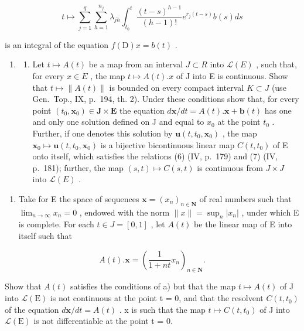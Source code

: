\[
t \mapsto \sum_ {j = 1} ^ {q} \sum_ {h = 1} ^ {n _ {j}} \lambda_ {j h} \int_ {t _ {0}} ^ {t} \frac {(t - s) ^ {h - 1}}{(h - 1) !} e ^ {r _ {j} (t - s)} b (s) d s
\]

is an integral of the equation \(f(\mathrm{D})x = b(t)\) .

\begin{enumerate}
\def\labelenumi{\arabic{enumi})}
\setcounter{enumi}{6}
\tightlist
\item
  \begin{enumerate}
  \def\labelenumii{\alph{enumii})}
  \tightlist
  \item
    Let \(t \mapsto A(t)\) be a map from an interval \(J \subset R\) into \(\mathcal{L}(E)\) , such that, for every \(x \in E\) , the map \(t \mapsto A(t).x\) of J into E is continuous. Show that \(t \mapsto \|A(t)\|\) is bounded on every compact interval \(K \subset J\) (use Gen.~Top., IX, p.~194, th. 2). Under these conditions show that, for every point \((t_{0}, \mathbf{x}_{0}) \in \mathbf{J} \times \mathbf{E}\) the equation \(d\mathbf{x}/dt = A(t).\mathbf{x} + \mathbf{b}(t)\) has one and only one solution defined on J and equal to \(x_{0}\) at the point \(t_{0}\) . Further, if one denotes this solution by \(\mathbf{u}(t, t_{0}, \mathbf{x}_{0})\) , the map \(\mathbf{x}_{0} \mapsto \mathbf{u}(t, t_{0}, \mathbf{x}_{0})\) is a bijective bicontinuous linear map \(C(t, t_{0})\) of E onto itself, which satisfies the relations (6) (IV, p.~179) and (7) (IV, p.~181); further, the map \((s, t) \mapsto C(s, t)\) is continuous from \(J \times J\) into \(\mathcal{L}(E)\) .
  \end{enumerate}
\end{enumerate}

\begin{enumerate}
\def\labelenumi{\alph{enumi})}
\setcounter{enumi}{1}
\tightlist
\item
  Take for E the space of sequences \(\mathbf{x}=(x_{n})_{n\in\mathbf{N}}\) of real numbers such that \(\lim_{n\to\infty}x_{n}=0\) , endowed with the norm \(\|x\|=\sup_{n}|x_{n}|\) , under which E is complete. For each \(t\in J=[0,1]\) , let \(A(t)\) be the linear map of E into itself such that
\end{enumerate}

\[
A (t). \mathbf {x} = \left(\frac {1}{1 + n t} x _ {n}\right) _ {n \in \mathbf {N}}.
\]

Show that \(A(t)\) satisfies the conditions of a) but that the map \(t \mapsto A(t)\) of J into \(\mathcal{L}(\mathrm{E})\) is not continuous at the point t = 0, and that the resolvent \(C(t, t_0)\) of the equation \(d\mathbf{x}/dt = A(t)\) . x is such that the map \(t \mapsto C(t, t_0)\) of J into \(\mathcal{L}(\mathrm{E})\) is not differentiable at the point t = 0.

